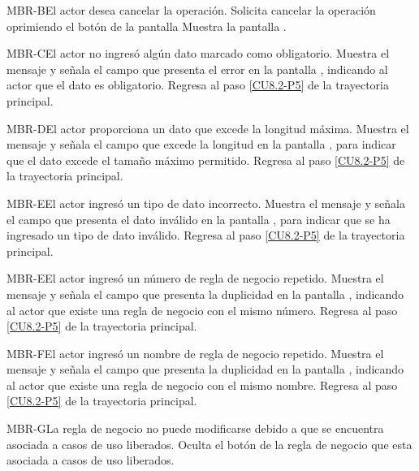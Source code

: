 	\begin{UCtrayectoriaA}{MBR-B}{El actor desea cancelar la operación.}
		\UCpaso[\UCactor] Solicita cancelar la operación oprimiendo el botón  de la pantalla 
		\UCpaso[\UCsist] Muestra la pantalla .
	\end{UCtrayectoriaA}

	\begin{UCtrayectoriaA}{MBR-C}{El actor no ingresó algún dato marcado como obligatorio.}
		\UCpaso[\UCsist] Muestra el mensaje  y señala el campo que presenta el error en la pantalla , indicando al actor que el dato es obligatorio.
		\UCpaso Regresa al paso \ref{CU8.2-P5} de la trayectoria principal.
	\end{UCtrayectoriaA}

	\begin{UCtrayectoriaA}{MBR-D}{El actor proporciona un dato que excede la longitud máxima.}
		\UCpaso[\UCsist] Muestra el mensaje  y señala el campo que excede la longitud en la pantalla , para indicar que el dato excede el tamaño máximo permitido.
		\UCpaso Regresa al paso \ref{CU8.2-P5} de la trayectoria principal.
	\end{UCtrayectoriaA}

	\begin{UCtrayectoriaA}{MBR-E}{El actor ingresó un tipo de dato incorrecto.}
		\UCpaso[\UCsist] Muestra el mensaje  y señala el campo que presenta el dato inválido en la pantalla , para indicar que se ha ingresado un tipo de dato inválido.
		\UCpaso Regresa al paso \ref{CU8.2-P5} de la trayectoria principal.
	\end{UCtrayectoriaA}
	
	\begin{UCtrayectoriaA}{MBR-E}{El actor ingresó un número de regla de negocio repetido.}
		\UCpaso[\UCsist] Muestra el mensaje  y señala el campo que presenta la duplicidad en
		la pantalla , indicando al actor que existe una regla de negocio con el mismo número.
		\UCpaso Regresa al paso \ref{CU8.2-P5} de la trayectoria principal.
	\end{UCtrayectoriaA}
	
	\begin{UCtrayectoriaA}{MBR-F}{El actor ingresó un nombre de regla de negocio repetido.}
		\UCpaso[\UCsist] Muestra el mensaje  y señala el campo que presenta la duplicidad en la pantalla , indicando al actor que existe una regla de negocio con el mismo nombre.
		\UCpaso Regresa al paso \ref{CU8.2-P5} de la trayectoria principal.
	\end{UCtrayectoriaA}

	\begin{UCtrayectoriaA}{MBR-G}{La regla de negocio no puede modificarse debido a que se encuentra asociada a casos de uso liberados.}
		\UCpaso[\UCsist] Oculta el botón \editar de la regla de negocio que esta asociada a casos de uso liberados.
	\end{UCtrayectoriaA}
